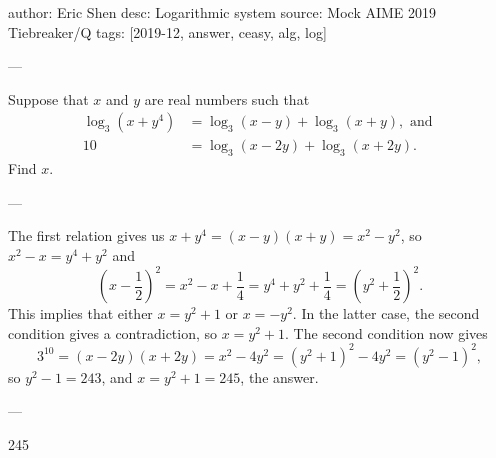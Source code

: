 author: Eric Shen
desc: Logarithmic system
source: Mock AIME 2019 Tiebreaker/Q
tags: [2019-12, answer, ceasy, alg, log]

---

Suppose that $x$ and $y$ are real numbers such that
\begin{align*}
    \log_3(x+y^4)&=\log_3(x-y)+\log_3(x+y),\text{ and }\\
    10&=\log_3(x-2y)+\log_3(x+2y).
\end{align*}
Find $x$.

---

The first relation gives us $x+y^4=(x-y)(x+y)=x^2-y^2$, so $x^2-x=y^4+y^2$ and \[\left(x-\frac12\right)^2=x^2-x+\frac14=y^4+y^2+\frac14=\left(y^2+\frac12\right)^2.\]
This implies that either $x=y^2+1$ or $x=-y^2$. In the latter case, the second condition gives a contradiction, so $x=y^2+1$. The second condition now gives \[3^{10}=(x-2y)(x+2y)=x^2-4y^2=(y^2+1)^2-4y^2=(y^2-1)^2,\]so $y^2-1=243$, and $x=y^2+1=245$, the answer.

---

245
